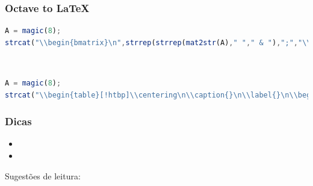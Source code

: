 \begin{frame}
\frametitle{Octave to \LaTeX{}}

\begin{lstlisting}[language=Octave, label=lst-octave-matrix, caption={Gerando a matriz em \LaTeX{} a partir do GNU Octave}, postbreak=\mbox{$\hookrightarrow$\space}, basicstyle=\fontsize{8}{10}\selectfont\ttfamily]
A = magic(8);
strcat("\\begin{bmatrix}\n",strrep(strrep(mat2str(A)," "," & "),";","\\\\\n")(2:end-1),"\n\\end{bmatrix}\n")
\end{lstlisting}

$

$

\begin{lstlisting}[language=Octave, label=lst-octave-table, caption={Gerando uma tabela em \LaTeX{} a partir do GNU Octave}, postbreak=\mbox{$\hookrightarrow$\space}, basicstyle=\fontsize{8}{10}\selectfont\ttfamily]
A = magic(8);
strcat("\\begin{table}[!htbp]\\centering\n\\caption{}\n\\label{}\n\\begin{tabular}{",repmat('l',1,size(A,2)),"}\n\\hline\n",strrep(strrep(mat2str(A)," "," & "),";","\\\\\n")(2:end-1),"\\\\\n\\hline\n\\end{tabular}\n\\end{table}")
\end{lstlisting}

\framebreak


\framebreak


\end{frame}



\begin{frame}
\frametitle{Dicas}
\begin{itemize}
\item {}
\item {}
\end{itemize}
\end{frame}




\begin{frame}
Sugestões de leitura: 
\vspace{2ex}

\vspace{2ex}

\end{frame}
